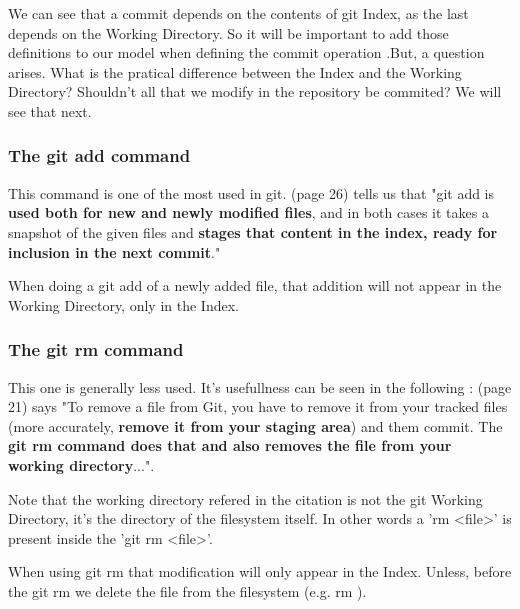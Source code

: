 We can see  
that a commit depends on the contents of git Index, as the
last depends on the Working Directory. So it will be important
to add those definitions to our model when defining the commit operation
.But, a question arises.
What is the pratical difference between the Index and the Working
Directory? Shouldn't all that we modify in the repository be 
commited? We will see that next. 

\subsubsection{The git add command}

This command is one of the most used in git. \cite{gitComm} (page 26)
tells us that
"git add is {\bf used both for new and newly modified files},
and in both cases it takes a snapshot of the given files
and {\bf stages that content in the index, ready for inclusion
in the next commit}." \par 
When doing a git add of a newly
added file, that
addition will not appear in the Working Directory, only in the
Index. 
\subsubsection{The git rm command}

This one is generally less used. It's usefullness can be
seen in the following : \cite{Chacon:2009:PG:1618548}
(page 21) says "To remove a file from Git, you have to remove it
from your tracked files (more accurately, {\bf remove it from your
staging area}) and them commit. The {\bf git rm command does that
and also removes the file from your working directory}...". \par
Note that the working directory refered in the citation is not
the git Working Directory, it's the directory of the filesystem itself.
In other words a 'rm <file>' is present inside the 'git rm <file>'. \par
When using git rm
that modification will only appear in the Index. Unless, before
the git rm we delete the file from the filesystem (e.g. rm ). \par

